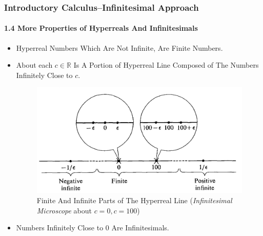 \begin{frame}
\frametitle{Introductory Calculus--Infinitesimal Approach}
\framesubtitle{1.4 More Properties of Hyperreals And Infinitesimals}
\label{slide:1.4-07}
\begin{itemize}
\item<1->
Hyperreal Numbers Which Are Not Infinite, Are \alert{Finite Numbers}.
\item<2->
About each $c\in\mathbb{R}$ Is \alert{A Portion of Hyperreal Line Composed of The Numbers Infinitely Close to $c$}.
{
\begin{figure}[H]
\centering
\includegraphics[width=.5\textwidth]{images/infinitesimal-microscope}
\caption{Finite And Infinite Parts of The Hyperreal Line (\textit{Infinitesimal Microscope} about $c=0,c=100$)}
\label{fig:finfinhyperreal}
\end{figure}
}
\item<3->
\alert{Numbers Infinitely Close to $0$ Are Infinitesimals}.
\end{itemize}
\end{frame}
